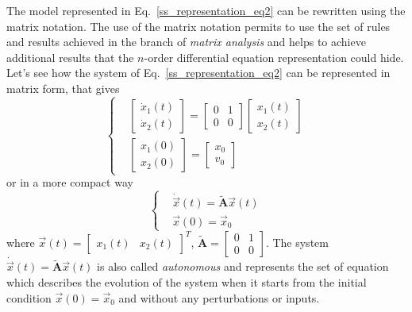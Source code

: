 \documentclass[11pt,a4paper,oneside]{book}
\numberwithin{equation}{section}
\theoremstyle{it}
\theoremstyle{definition}
\begin{document}
The model represented in Eq.~\eqref{ss_representation_eq2} can be rewritten 
using the matrix notation. The use of the matrix notation permits to use the 
set of rules and results achieved in the branch of \textit{matrix analysis} 
and helps to achieve additional results that the $n$-order differential 
equation representation could hide. Let's see how the system of 
Eq.~\eqref{ss_representation_eq2} can be represented in matrix form, that gives
\begin{equation}\label{ss_representation_eq3}
	\left\lbrace \begin{aligned}
		&\begin{bmatrix} \dot{x}_1(t)\\ \dot{x}_2(t) \end{bmatrix} = \begin{bmatrix} 0&1\\0&0 \end{bmatrix} \begin{bmatrix} {x}_1(t)\\ {x}_2(t) \end{bmatrix} \\[6pt]
		&\begin{bmatrix} {x}_1(0)\\ {x}_2(0) \end{bmatrix} = \begin{bmatrix} x_0 \\ v_0 \end{bmatrix}
	\end{aligned}\right. 
\end{equation}
or in a more compact way
\begin{equation}\label{ss_representation_eq4}
	\left\lbrace \begin{aligned}
		&\dot{\vec{x}}(t)=\tilde{\mathbf{A}}\vec{x}(t) \\[6pt]
		&\vec{x}(0) = \vec{x}_0
	\end{aligned}\right. 
\end{equation}
where $\vec{x}(t)=\begin{bmatrix} x_1(t)&x_2(t) \end{bmatrix}^T$, $\tilde{\mathbf{A}}=\begin{bmatrix} 0&1\\0&0 \end{bmatrix}$.
The system $\dot{\vec{x}}(t)=\tilde{\mathbf{A}}\vec{x}(t)$ is also called 
\textit{autonomous} and represents the set of equation which describes the 
evolution of the system when it starts from the initial condition 
$\vec{x}(0)=\vec{x}_0$ and without any perturbations or inputs.
\end{document}
